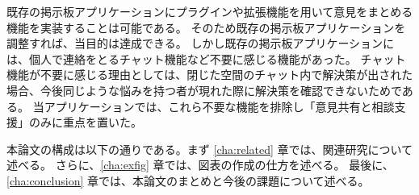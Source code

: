 \documentclass[main]{subfiles}
\begin{document}
既存の掲示板アプリケーションにプラグインや拡張機能を用いて意見をまとめる機能を実装することは可能である。
そのため既存の掲示板アプリケーションを調整すれば、当目的は達成できる。
しかし既存の掲示板アプリケーションには、個人で連絡をとるチャット機能など不要に感じる機能があった。%
チャット機能が不要に感じる理由としては、閉じた空間のチャット内で解決策が出された場合、今後同じような悩みを持つ者が現れた際に解決策を確認できないためである。
当アプリケーションでは、これら不要な機能を排除し「意見共有と相談支援」のみに重点を置いた。

本論文の構成は以下の通りである。まず \ref{cha:related} 章では、関連研究について述べる。
さらに、\ref{cha:exfig} 章では、図表の作成の仕方を述べる。
最後に、\ref{cha:conclusion} 章では、本論文のまとめと今後の課題について述べる。
\end{document}
